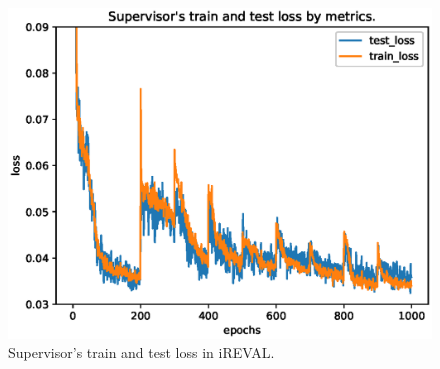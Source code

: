 \documentclass[english]{sobraep}
\begin{document}
\begin{figure}
    \centering
    \captionsetup{justification=centering}
    \includegraphics[scale=0.5]{Figures/CIFAR10/sp_ol_train_test.eps}
    \caption{Supervisor's train and test loss in iREVAL.}
    \label{fig:iREVAL_train_test}
\end{figure}
\end{document}
